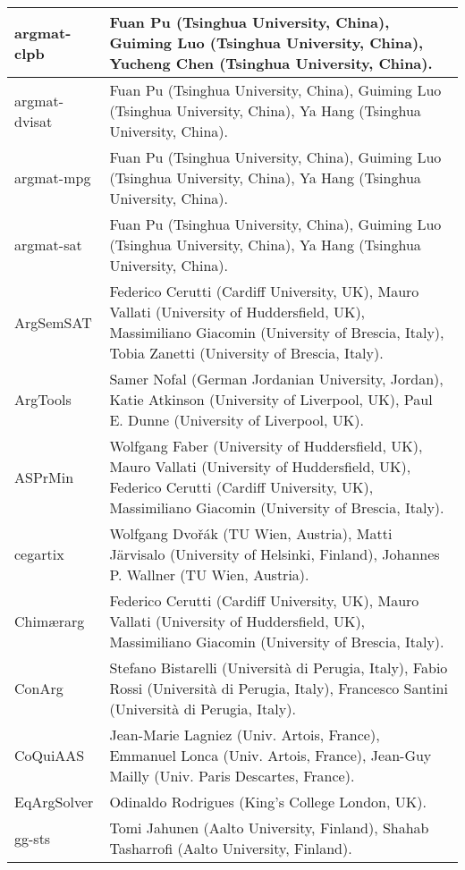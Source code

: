 \begin{center}
\begin{longtable}{| p{} | p{} |}
argmat-clpb   & Fuan Pu (Tsinghua University, China), Guiming Luo (Tsinghua University, China), Yucheng Chen (Tsinghua University, China).                  \\ \midrule
argmat-dvisat & Fuan Pu (Tsinghua University, China), Guiming Luo (Tsinghua University, China), Ya Hang (Tsinghua University, China).                    \\ \hline
argmat-mpg & Fuan Pu (Tsinghua University, China), Guiming Luo (Tsinghua University, China), Ya Hang (Tsinghua University, China).                    \\ \hline
argmat-sat & Fuan Pu (Tsinghua University, China), Guiming Luo (Tsinghua University, China), Ya Hang (Tsinghua University, China).                    \\ \hline
ArgSemSAT  & Federico Cerutti (Cardiff University, UK), Mauro Vallati (University of Huddersfield, UK), Massimiliano Giacomin (University of Brescia, Italy), Tobia Zanetti (University of Brescia, Italy). \\ \hline
ArgTools   & Samer Nofal (German Jordanian University, Jordan), Katie Atkinson (University of Liverpool, UK), Paul E. Dunne (University of Liverpool, UK).              \\ \hline
ASPrMin    & Wolfgang Faber (University of Huddersfield, UK), Mauro Vallati (University of Huddersfield, UK), Federico Cerutti (Cardiff University, UK), Massimiliano Giacomin (University of Brescia, Italy). \\ \hline
cegartix   & Wolfgang Dvořák (TU Wien, Austria), Matti Järvisalo (University of Helsinki, Finland), Johannes P. Wallner (TU Wien, Austria).                 \\ \hline
Chimærarg  & Federico Cerutti (Cardiff University, UK), Mauro Vallati (University of Huddersfield, UK), Massimiliano Giacomin (University of Brescia, Italy).              \\ \hline
ConArg  & Stefano Bistarelli (Università di Perugia, Italy), Fabio Rossi (Università di Perugia, Italy), Francesco Santini (Università di Perugia, Italy).              \\ \hline
CoQuiAAS   & Jean-Marie Lagniez (Univ. Artois, France), Emmanuel Lonca (Univ. Artois, France), Jean-Guy Mailly (Univ. Paris Descartes, France).                \\ \hline
EqArgSolver   & Odinaldo Rodrigues (King's College London, UK).                                       \\ \hline
gg-sts  & Tomi Jahunen (Aalto University, Finland), Shahab Tasharrofi (Aalto University, Finland).                            \\ \hline

\end{longtable}
\end{center}
